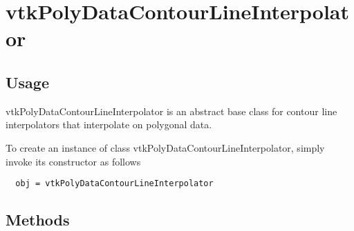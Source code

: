 \section{vtkPolyDataContourLineInterpolator}

\subsection{Usage}

 vtkPolyDataContourLineInterpolator is an abstract base class for contour
 line interpolators that interpolate on polygonal data.


To create an instance of class vtkPolyDataContourLineInterpolator, simply
invoke its constructor as follows
\begin{verbatim}
  obj = vtkPolyDataContourLineInterpolator
\end{verbatim}
\subsection{Methods}

